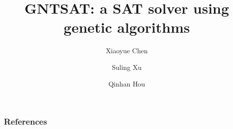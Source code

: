 \documentclass{beamer}
\title[GNTSAT]{GNTSAT: a SAT solver using genetic algorithms}
\author[Chen, Xu, Hou]{
	Xiaoyue Chen \and Suling Xu \and Qinhan Hou
}
\institute[UU]{Uppsala University}
\begin{document}
\frame{\titlepage}





\begin{frame}
\frametitle{References}
\printbibliography
\end{frame}
\end{document}
